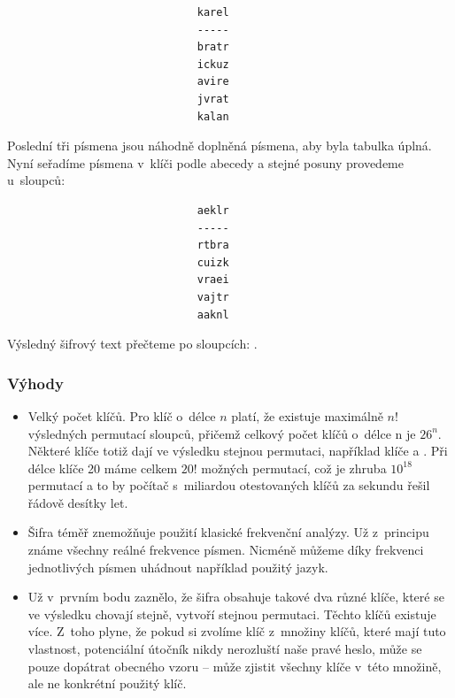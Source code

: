 \documentclass[12pt]{article}
\theoremstyle{definition}
\begin{document}
\begin{verbatim}
                              karel
                              -----
                              bratr
                              ickuz
                              avire
                              jvrat
                              kalan
\end{verbatim}

Poslední tři písmena jsou náhodně doplněná písmena, aby byla tabulka úplná. Nyní seřadíme písmena v~klíči podle abecedy a stejné posuny provedeme u~sloupců:

\begin{verbatim}
                              aeklr
                              -----
                              rtbra
                              cuizk
                              vraei
                              vajtr
                              aaknl
\end{verbatim}

Výsledný šifrový text přečteme po sloupcích: .

\subsubsection{Výhody}
\begin{itemize}
\item Velký počet klíčů. Pro klíč o~délce $n$ platí, že existuje maximálně $n!$ výsledných permutací sloupců, přičemž celkový počet klíčů o~délce n je $26^n$. Některé klíče totiž dají ve výsledku stejnou permutaci, například klíče  a . Při délce klíče 20 máme celkem $20!$ možných permutací, což je zhruba $10^{18}$ permutací a to by počítač s~miliardou otestovaných klíčů za sekundu řešil řádově desítky let.
\item Šifra téměř znemožňuje použití klasické frekvenční analýzy. Už z~principu známe všechny reálné frekvence písmen. Nicméně můžeme díky frekvenci jednotlivých písmen uhádnout například použitý jazyk.
\item Už v~prvním bodu zaznělo, že šifra obsahuje takové dva různé klíče, které se ve výsledku chovají stejně, vytvoří stejnou permutaci. Těchto klíčů existuje více. Z~toho plyne, že pokud si zvolíme klíč z~množiny klíčů, které mají tuto vlastnost, potenciální útočník nikdy nerozluští naše pravé heslo, může se pouze dopátrat obecného vzoru -- může zjistit všechny klíče v~této množině, ale ne konkrétní použitý klíč. 
\end{itemize}
\end{document}
